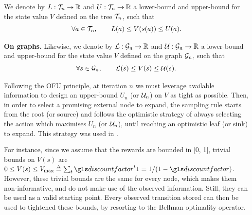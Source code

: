 \begin{definition}
	\begin{leftbar}[defnbar]
	\leavevmode\newline
	 We denote by $L:\mathcal{T}_n \rightarrow \mathbb{R}$ and  $U:\mathcal{T}_n \rightarrow \mathbb{R}$ a lower-bound and upper-bound for the state value $V$ defined on the tree $\mathcal{T}_n$, such that
	\begin{equation*}
	\forall a\in\mathcal{T}_n, \qquad L(a) \leq V(s(a)) \leq U(a).
	\end{equation*}
	
	{\textbf{On graphs.}} Likewise, we denote by $\mathcal{L}:\mathcal{G}_n \rightarrow \mathbb{R}$ and  $\mathcal{U}:\mathcal{G}_n \rightarrow \mathbb{R}$ a lower-bound and upper-bound for the state value $V$ defined on the graph $\mathcal{G}_n$, such that
	\begin{equation*}
	\forall s\in\mathcal{G}_n, \qquad \mathcal{L}(s) \leq V(s) \leq \mathcal{U}(s).
	\end{equation*}
	\end{leftbar}
\end{definition}

Following the \gls{OFU} principle, at iteration $n$ we must leverage available information to design an upper-bound $U_n$ (or $\mathcal{U}_n$) on $V$ as tight as possible. Then, in order to select a promising external node to expand, the sampling rule starts from the root (or source) and follows the optimistic strategy of always selecting the action which maximises $U_n$ (or $\mathcal{U}_n$), until reaching an optimistic leaf (or sink) to expand. This strategy was used in \citep[\eg][]{Kocsis2006, Hren2008, Bubeck2010, Busoniu2012optimistic}.

For instance, since we assume that the rewards are bounded in [0, 1], trivial bounds on $V(s)$ are
$0 \leq V(s) \leq V_{\max} \eqdef \sum_t \discount^t 1 ={1}/({1-\discount})$. However, these trivial bounds are the same for every node, which makes them non-informative, and do not make use of the observed information. Still, they can be used as a valid starting point. Every observed transition stored can then be used to tightened these bounds, by resorting to the Bellman optimality operator.

